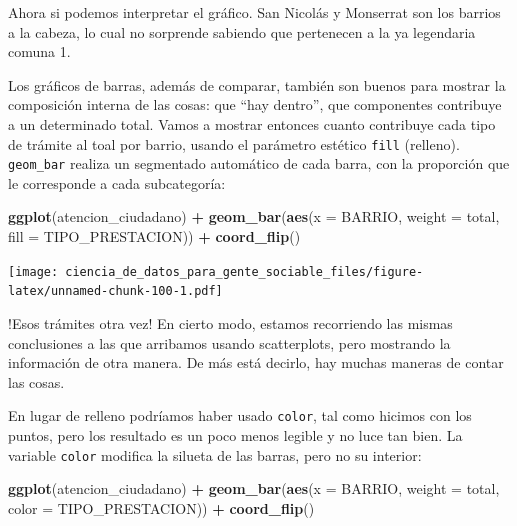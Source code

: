 \documentclass[]{book}
\newenvironment{Shaded}{\begin{snugshade}}{\end{snugshade}}
\newcommand{\KeywordTok}[1]{\textcolor[rgb]{0.13,0.29,0.53}{\textbf{#1}}}
\newcommand{\DataTypeTok}[1]{\textcolor[rgb]{0.13,0.29,0.53}{#1}}
\newcommand{\StringTok}[1]{\textcolor[rgb]{0.31,0.60,0.02}{#1}}
\newcommand{\OperatorTok}[1]{\textcolor[rgb]{0.81,0.36,0.00}{\textbf{#1}}}
\newcommand{\NormalTok}[1]{#1}
\begin{document}
Ahora si podemos interpretar el gráfico. San Nicolás y Monserrat son los
barrios a la cabeza, lo cual no sorprende sabiendo que pertenecen a la
ya legendaria comuna 1.

Los gráficos de barras, además de comparar, también son buenos para
mostrar la composición interna de las cosas: que ``hay dentro'', que
componentes contribuye a un determinado total. Vamos a mostrar entonces
cuanto contribuye cada tipo de trámite al toal por barrio, usando el
parámetro estético \texttt{fill} (relleno). \texttt{geom\_bar} realiza
un segmentado automático de cada barra, con la proporción que le
corresponde a cada subcategoría:

\begin{Shaded}
\begin{Highlighting}[]
\KeywordTok{ggplot}\NormalTok{(atencion_ciudadano) }\OperatorTok{+}
\StringTok{    }\KeywordTok{geom_bar}\NormalTok{(}\KeywordTok{aes}\NormalTok{(}\DataTypeTok{x =}\NormalTok{ BARRIO, }\DataTypeTok{weight =}\NormalTok{ total, }\DataTypeTok{fill =}\NormalTok{ TIPO_PRESTACION)) }\OperatorTok{+}
\StringTok{    }\KeywordTok{coord_flip}\NormalTok{()}
\end{Highlighting}
\end{Shaded}

\texttt{[image: ciencia\_de\_datos\_para\_gente\_sociable\_files/figure-latex/unnamed-chunk-100-1.pdf]}

!Esos trámites otra vez! En cierto modo, estamos recorriendo las mismas
conclusiones a las que arribamos usando scatterplots, pero mostrando la
información de otra manera. De más está decirlo, hay muchas maneras de
contar las cosas.

En lugar de relleno podríamos haber usado \texttt{color}, tal como
hicimos con los puntos, pero los resultado es un poco menos legible y no
luce tan bien. La variable \texttt{color} modifica la silueta de las
barras, pero no su interior:

\begin{Shaded}
\begin{Highlighting}[]
\KeywordTok{ggplot}\NormalTok{(atencion_ciudadano) }\OperatorTok{+}
\StringTok{    }\KeywordTok{geom_bar}\NormalTok{(}\KeywordTok{aes}\NormalTok{(}\DataTypeTok{x =}\NormalTok{ BARRIO, }\DataTypeTok{weight =}\NormalTok{ total, }\DataTypeTok{color =}\NormalTok{ TIPO_PRESTACION)) }\OperatorTok{+}
\StringTok{    }\KeywordTok{coord_flip}\NormalTok{()}
\end{Highlighting}
\end{Shaded}
\end{document}

